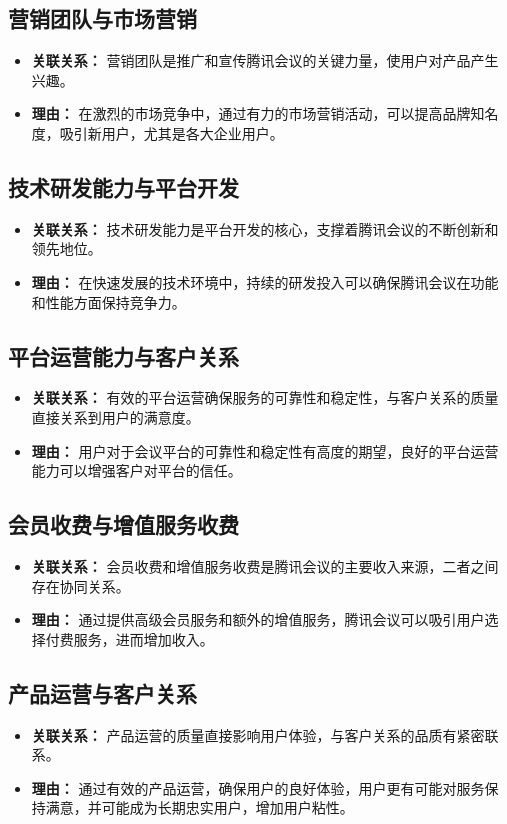 \documentclass[a4paper,12pt]{article}
\begin{document}
    \subsection{营销团队与市场营销}
    \begin{itemize}
        \item\textbf{关联关系：} 营销团队是推广和宣传腾讯会议的关键力量，使用户对产品产生兴趣。
        \item\textbf{理由：} 在激烈的市场竞争中，通过有力的市场营销活动，可以提高品牌知名度，吸引新用户，尤其是各大企业用户。
    \end{itemize}
    \subsection{技术研发能力与平台开发}
    \begin{itemize}
        \item\textbf{关联关系：} 技术研发能力是平台开发的核心，支撑着腾讯会议的不断创新和领先地位。
        \item\textbf{理由：} 在快速发展的技术环境中，持续的研发投入可以确保腾讯会议在功能和性能方面保持竞争力。
    \end{itemize}
    \subsection{平台运营能力与客户关系}
    \begin{itemize}
        \item\textbf{关联关系：} 有效的平台运营确保服务的可靠性和稳定性，与客户关系的质量直接关系到用户的满意度。
        \item\textbf{理由：} 用户对于会议平台的可靠性和稳定性有高度的期望，良好的平台运营能力可以增强客户对平台的信任。
    \end{itemize}
    \subsection{会员收费与增值服务收费}
    \begin{itemize}
        \item\textbf{关联关系：} 会员收费和增值服务收费是腾讯会议的主要收入来源，二者之间存在协同关系。
        \item\textbf{理由：} 通过提供高级会员服务和额外的增值服务，腾讯会议可以吸引用户选择付费服务，进而增加收入。
    \end{itemize}
    \subsection{产品运营与客户关系}
    \begin{itemize}
        \item\textbf{关联关系：} 产品运营的质量直接影响用户体验，与客户关系的品质有紧密联系。
        \item\textbf{理由：} 通过有效的产品运营，确保用户的良好体验，用户更有可能对服务保持满意，并可能成为长期忠实用户，增加用户粘性。
    \end{itemize}
\end{document}
